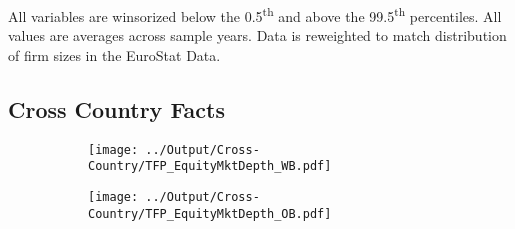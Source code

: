 \documentclass[12pt,notitlepage]{article}
\begin{document}
\begin{table}[!htpb]
\caption{French Summary Statistics}

All variables are winsorized below the 0.5\textsuperscript{th} and above the 99.5\textsuperscript{th} percentiles. All values are averages across sample years. Data is reweighted to match distribution of firm sizes in the EuroStat Data.
\end{table}




\clearpage



\FloatBarrier
\subsection{Cross Country Facts} %
\label{sec:cross_country_facts}
\FloatBarrier



\begin{figure}[!htpb]
\centering
\caption{Total Factor Productivity (European Countries)}
\begin{subfigure}{.49\textwidth}
    \centering
 \texttt{[image: ../Output/Cross-Country/TFP\_EquityMktDepth\_WB.pdf]}
\end{subfigure}
\begin{subfigure}{.49\textwidth}
    \centering
  \texttt{[image: ../Output/Cross-Country/TFP\_EquityMktDepth\_OB.pdf]}
\end{subfigure}
\end{figure}
\FloatBarrier
\end{document}
